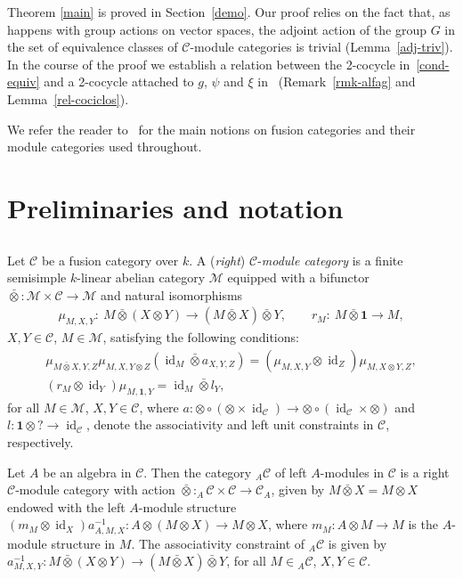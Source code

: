 \documentclass[pdftex]{sigma}
\numberwithin{equation}{section}
\newcommand{\oot}{\bar\otimes}
\newcommand{\C}{{\mathcal C}}
\newcommand{\M}{{\mathcal M}}
\newcommand{\1}{\textbf{1}}
\newcommand\id{\operatorname{id}}
\begin{document}
Theorem \ref{main} is proved in Section~\ref{demo}. Our proof relies on the fact that, as happens with group actions on vector spaces, the adjoint action of the group $G$ in the set of equivalence classes of $\C$-module categories is trivial (Lemma~\ref{adj-triv}). In the course of the proof we establish a relation between the 2-cocycle in~\eqref{cond-equiv} and a 2-cocycle attached to $g$, $\psi$ and $\xi$ in~\cite{ostrik} (Remark~\ref{rmk-alfag} and Lemma~\ref{rel-cociclos}).

We refer the reader to~\cite{egno} for the main notions on fusion categories and their module categories used throughout.

\section{Preliminaries and notation}\label{prels}

\subsection{}
Let $\mathcal{C}$ be a fusion category over $k$. A (\emph{right}) $\C$-\emph{module category} is a f\/inite semisimple $k$-linear abelian category $\mathcal{M}$ equipped with a bifunctor $\oot\colon \mathcal{M}\times \mathcal{C} \rightarrow\mathcal{M}$ and natural isomorphisms
\begin{gather*}\mu_{M, X,Y}\colon \ M \oot (X\otimes Y)\rightarrow (M\oot X)\oot Y,\qquad r_M\colon \ M \oot \textbf{1}\rightarrow M, \end{gather*}
$X, Y \in \C$, $M \in \mathcal M$, satisfying the following conditions:
\begin{gather} \label{modcat1} \mu_{M\oot X, Y, Z} \mu_{M, X, Y \otimes Z} ( \id_M \oot a_{X, Y, Z} ) =
 (\mu_{M, X, Y} \otimes \id_Z ) \mu_{M, X\otimes Y, Z},\\
 \label{modcat2} (r_M \otimes \id_Y ) \mu_{M, \1, Y} = \id_M \oot l_Y,
\end{gather}
for all $M \in \M$, $X, Y \in \C$, where $a\colon \otimes \circ (\otimes \times \id_\C) \to \otimes \circ (\id_\C \times \otimes)$ and $l\colon \textbf{1} \otimes ? \to \id_\C$, denote the associativity and left unit constraints in $\C$, respectively.

Let $A$ be an algebra in $\C$. Then the category $_A\C$ of left $A$-modules in $\C$ is a right $\C$-module category with action $\oot\colon _A\C \times \C \to \C_A$, given by $M\oot X = M\otimes X$ endowed with the left $A$-module structure $(m_M \otimes \id_X) a_{A, M, X}^{-1}\colon A\otimes (M\otimes X) \to M\otimes X$, where $m_M\colon A\otimes M \to M$ is the $A$-module structure in $M$. The associativity constraint of $_A\C$ is given by $a^{-1}_{M, X, Y}\colon M\oot (X \otimes Y) \to (M\oot X) \oot Y$, for all $M \in {} _A\C$, $X, Y \in \C$.
\end{document}
